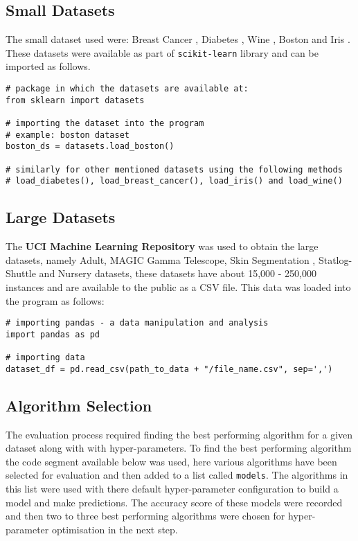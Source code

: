 \subsection*{Small Datasets}

The small dataset used were: Breast Cancer \citep{brendan-et-al}, Diabetes \citep{bradley-et-al}, Wine \citep{lichman:m}, Boston \citep{harrison-et-al} and Iris \citep{fisher:r}. These datasets were available as part of \texttt{scikit-learn} library and can be imported as follows.

\begin{lstlisting}
# package in which the datasets are available at:
from sklearn import datasets

# importing the dataset into the program
# example: boston dataset
boston_ds = datasets.load_boston()

# similarly for other mentioned datasets using the following methods
# load_diabetes(), load_breast_cancer(), load_iris() and load_wine()

\end{lstlisting}

\subsection*{Large Datasets}

The \textbf{UCI Machine Learning Repository} \citep{Dua:2019} was used to obtain the large datasets, namely Adult, MAGIC Gamma Telescope, Skin Segmentation \citep{skin-ds}, Statlog-Shuttle and Nursery \citep{Dua:2019} datasets, these datasets have about 15,000 - 250,000 instances and are available to the public as a CSV file. This data was loaded into the program as follows:

\begin{lstlisting}
# importing pandas - a data manipulation and analysis
import pandas as pd

# importing data
dataset_df = pd.read_csv(path_to_data + "/file_name.csv", sep=',')

\end{lstlisting}

\subsection*{Algorithm Selection}

The evaluation process required finding the best performing algorithm for a given dataset along with with hyper-parameters. To find the best performing algorithm the code segment available below was used, here various algorithms have been selected for evaluation and then added to a list called \texttt{models}. The algorithms in this list were used with there default hyper-parameter configuration to build a model and make predictions. The accuracy score of these models were recorded and then two to three best performing algorithms were chosen for hyper-parameter optimisation in the next step.
\newline

